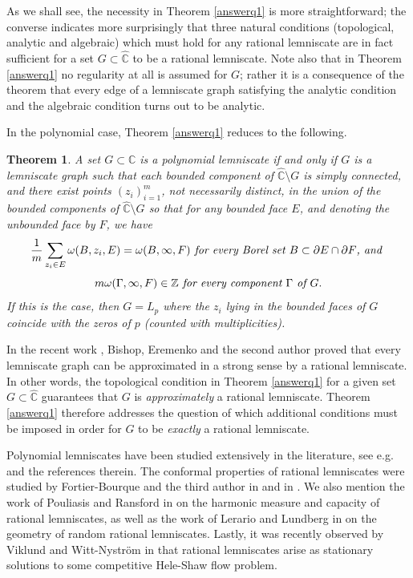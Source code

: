 \documentclass{amsart}
\theoremstyle{plain}
\newtheorem{theorem}{Theorem}[section]
\theoremstyle{definition}
\theoremstyle{remark}
\newcommand{\mC}{\mathbb{C}}
\newcommand{\hC}{\widehat{\mathbb{C}}}
\begin{document}
As we shall see, the necessity in Theorem \ref{answerq1} is more straightforward; the converse indicates more surprisingly that three natural conditions (topological, analytic and algebraic) which must hold for any rational lemniscate are in fact sufficient for a set $G \subset \hC$ to be a rational lemniscate. Note also that in Theorem \ref{answerq1} no regularity at all is assumed for $G$; rather it is a consequence of the theorem that every edge of a lemniscate graph satisfying the analytic condition and the algebraic condition turns out to be analytic.

In the polynomial case, Theorem \ref{answerq1} reduces to the following.

\begin{theorem}
\label{polyanswerq1} A set $G \subset \mC$ is a polynomial lemniscate if and only if $G$ is a lemniscate graph such that each bounded component of $\hC \setminus G$ is simply connected, and there exist points $(z_i)_{i=1}^m$, not necessarily distinct, in the union of the bounded components of $\hC \setminus G$ so that for any bounded face $E$, and denoting the unbounded face by $F$, we have
\begin{equation*} \frac{1}{m}\sum_{z_i \in E} \omega(B, z_i, E) = \omega(B, \infty, F) \emph{ for every Borel set } B\subset \partial E\cap \partial F\emph{, and }
\end{equation*}
\begin{equation*} m\omega(\Gamma, \infty, F) \in \mathbb{Z} \emph{ for every component } \Gamma \emph{ of } G.
\end{equation*}
If this is the case, then $G=L_p$ where the $z_i$ lying in the bounded faces of $G$ coincide with the zeros of $p$ (counted with multiplicities).
\end{theorem}

In the recent work \cite{BishopEremenkoLazebnik2025}, Bishop, Eremenko and the second author proved that every lemniscate graph can be approximated in a strong sense by a rational lemniscate. In other words, the topological condition in Theorem \ref{answerq1} for a given set $G \subset \hC$ guarantees that $G$ is \textit{approximately} a rational lemniscate. Theorem \ref{answerq1} therefore addresses the question of which additional conditions must be imposed in order for $G$ to be \textit{exactly} a rational lemniscate.

Polynomial lemniscates have been studied extensively in the literature, see e.g. \cite{BishopEremenkoLazebnik2025} and the references therein. The conformal properties of rational lemniscates were studied by Fortier-Bourque and the third author in \cite{FortierBourqueYounsi2015} and in \cite{Younsi2016}. We also mention the work of Pouliasis and Ransford in \cite{PouliasisRansford2016} on the harmonic measure and capacity of rational lemniscates, as well as the work of Lerario and Lundberg in \cite{LerarioLundberg2016} on the geometry of random rational lemniscates. Lastly, it was recently observed by Viklund and Witt-Nystr\"{o}m in \cite{WittViklund} that rational lemniscates arise as stationary solutions to some competitive Hele-Shaw flow problem.
\end{document}
